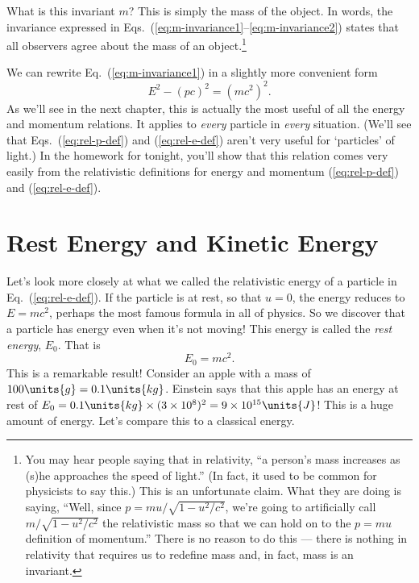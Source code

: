 What is this invariant $m$?  This is simply the mass of the object.
In words, the invariance expressed in
Eqs.~(\ref{eq:m-invariance1}--\ref{eq:m-invariance2}) states that
all observers agree about the mass of an object.\footnote{You may hear
people saying that in relativity, ``a person's mass increases as (s)he
approaches the speed of light.''  (In fact, it used to be common for
physicists to say this.)  This is an unfortunate claim.  What they are
doing is saying, ``Well, since $p = mu/\sqrt{1-u^2/c^2}$, we're going
to artificially call $m/\sqrt{1-u^2/c^2}$ the relativistic mass so
that we can hold on to the $p=mu$ definition of momentum.''  There is
no reason to do this --- there is nothing in relativity that requires
us to redefine mass and, in fact, mass is an invariant.}

We can rewrite Eq.~(\ref{eq:m-invariance1}) in a slightly more
convenient form
\begin{equation}
E^2 - (pc)^2 = (mc^2)^2.
\label{eq:m-invariance3}
\end{equation}
As we'll see in the next chapter, this is actually the most useful of
all the energy and momentum relations.  It applies to {\em every}
particle in {\em every} situation.  (We'll see that
Eqs.~(\ref{eq:rel-p-def}) and (\ref{eq:rel-e-def}) aren't very useful
for `particles' of light.)  In the homework for tonight, you'll show
that this relation comes very easily from the relativistic definitions
for energy and momentum (\ref{eq:rel-p-def}) and (\ref{eq:rel-e-def}).


\section{Rest Energy and Kinetic Energy}
Let's look more closely at what we called the relativistic energy of a
particle in Eq.~(\ref{eq:rel-e-def}).  If the particle is at rest, so
that $u = 0$, the energy reduces to $E = mc^2$, perhaps the most famous
formula in all of physics.  So we discover that a particle has energy
even when it's not moving!  This energy is called the {\em rest energy}, 
$E_0$.  That is
\begin{equation}
E_0 = mc^2.
\label{eq:emc2}
\end{equation}
This is a remarkable result! Consider an apple with a mass of 
$100\units{g}=0.1\units{kg}$.    Einstein
says that this apple has an energy at rest of $E_0 = 
0.1\units{kg}\times (3\times 10^8)^2 = 9\times 10^{15}\units{J}$!
This is a huge amount of energy. Let's compare this to a classical 
energy.

